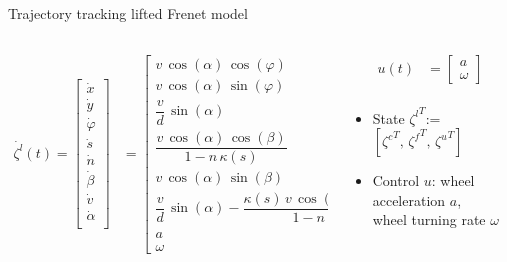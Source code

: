 \documentclass[10pt,aspectratio=1610]{beamer} %
\begin{document}
\begin{frame}{Trajectory tracking lifted Frenet model}
	\begin{columns}[onlytextwidth]

		\begin{column}{0.5\textwidth}
		\begin{align*}
			\dot{\zeta^{l}}(t) = 
			\begin{bmatrix}
				\dot{x}\\
				\dot{y}\\
				\dot{\varphi}\\
				\dot{s}\\
				\dot{n}\\
				\dot{\beta}\\
				\dot{v}\\
				\dot{\alpha}\\
			\end{bmatrix} &= 
			\begin{bmatrix}
				v\, \cos(\alpha)\, \cos(\varphi)\\
				v\, \cos(\alpha)\, \sin(\varphi)\\
				\dfrac{v}{d}\, \sin(\alpha)\\
				\dfrac{v\, \cos(\alpha)\, \cos(\beta)}{1 - n\, \kappa(s)}\\
				v\, \cos(\alpha)\, \sin(\beta)\\
				\dfrac{v}{d}\, \sin(\alpha) - \dfrac{\kappa(s)\, v\, \cos(\alpha)\, \cos(\beta)}{1 - n\, \kappa(s)}\\
				a\\
				\omega
			\end{bmatrix}
		\end{align*}
		\end{column}
		\begin{column}{0.5\textwidth}
		\begin{align*}
			u(t) &= 
			\begin{bmatrix}
				a \\
				\omega
			\end{bmatrix}\\
		\end{align*}
		\begin{itemize}[label=\textbullet]
			\item State ${\zeta^{l}}^T$:= $[{\zeta^{c}}^T,\,{\zeta^{f}}^T,\,{\zeta^{u}}^T]$
			\item Control $u$: wheel acceleration $a$,\\
			\hspace{0.62in} wheel turning rate $\omega$
		\end{itemize}
		\end{column}
	\end{columns}
\end{frame}
\end{document}
